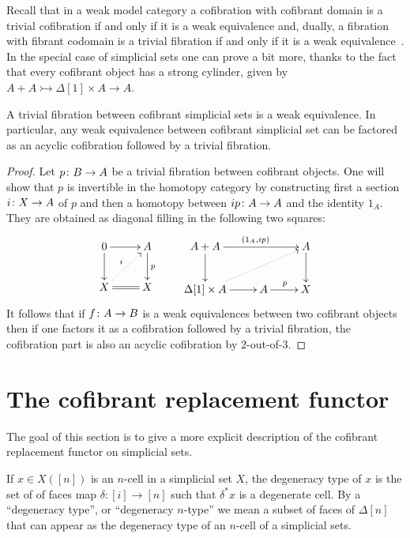 \documentclass[reqno,10pt,a4paper,oneside,draft]{amsart}
\begin{document}
Recall that in a weak model category  a  cofibration with cofibrant domain is a trivial cofibration if and only if it is a weak equivalence and, dually,  a fibration with fibrant codomain is a trivial fibration if and only if it is a  weak equivalence~\cite[Proposition 2.2.9]{henry2018wms}. In the special case of simplicial sets one can prove a bit more,
thanks to the fact that every cofibrant object has a strong cylinder, given by~$A + A \rightarrowtail \Delta[1] \times A \rightarrow A$.
 


\begin{lemma}\label{lemma:triv_fib_are_we}
A trivial fibration between cofibrant simplicial sets is a weak equivalence.
In particular, any weak equivalence between cofibrant simplicial set can be factored as an acyclic cofibration followed by a trivial fibration.
\end{lemma}

\begin{proof}
Let $p \colon B \to A$ be a trivial fibration between cofibrant objects. One will show that $p$ is invertible in the homotopy category by constructing first a section $i \colon X \rightarrow A$ of $p$ and then a homotopy between $i  p \colon A \to A$ and the identity $1_{A}$. They are obtained as diagonal filling in the following two squares:
\[
\xymatrix{0 \ar[r] \ar[d] & A \ar[d]^{p} \\ 
X \ar@{.>}[ur]^{i} \ar@{=}[r] & X}
\qquad
\xymatrix{A + A \ar[rr]^{(1_{A} , i  p)} \ar[d] & &  A \ar[d] \\ \Delta[1] \times A \ar@{.>}[rru] \ar[r]& A \ar[r]^{p} & X  }
\]
It follows that if $f \colon A \rightarrow B$ is a weak equivalences between two cofibrant objects then if one factors it as a cofibration followed by a trivial fibration, the cofibration part is also an acyclic cofibration by $2$-out-of-$3$.
\end{proof}






 
\section{The cofibrant replacement functor}

The goal of this section is to give a more explicit description of the cofibrant replacement functor on simplicial sets.


\begin{definition}
If $x \in X([n])$ is an $n$-cell in a simplicial set $X$, the degeneracy type of $x$ is the set of of faces map $\delta:[i] \rightarrow [n]$ such that $\delta^* x$ is a degenerate cell. 
By a ``degeneracy type'', or ``degeneracy $n$-type'' we mean a subset of faces of $\Delta[n]$ that can appear as the degeneracy type of an $n$-cell of a simplicial sets.
\end{definition}
\end{document}
